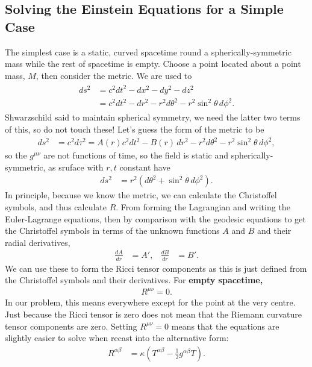 \documentclass[a4paper, 11pt, normalem]{report}
\begin{document}
\subsection{Solving the Einstein Equations for a Simple Case}
The simplest case is a static, curved spacetime round a spherically-symmetric mass while the rest of spacetime is empty. 
Choose a point located about a point mass, $M$, then consider the metric. 
We are used to 
\begin{align}
    \begin{split}
        ds^2 &= c^2dt^2 - dx^2 - dy^2 - dz^2 \\
             &= c^2dt^2 - dr^2 - r^2d\theta^2 - r^2\sin^2\theta\,d\phi^2.
    \end{split}
\end{align}
Shwarzschild said to maintain spherical symmetry, we need the latter two terms of this, so do not touch these!
Let's guess the form of the metric to be
\begin{align}
    ds^2 &= c^2d\tau^2 = A(r)c^2dt^2 - B(r)\,dr^2 - r^2d\theta^2 - r^2\sin^2\theta\,d\phi^2,
\end{align}
so the $g^{\mu\nu}$ are not functions of time, so the field is static and spherically-symmetric, as sruface with $r,t$ constant have
\begin{align}
    ds^2 &= r^2\left(d\theta^2+\sin^2\theta\,d\phi^2\right).
\end{align}
In principle, because we know the metric, we can calculate the Christoffel symbols, and thus calculate $R$.
From forming the Lagrangian and writing the Euler-Lagrange equations, then by comparison with the geodesic equations to get the Christoffel symbols in terms of the unknown functions $A$ and $B$ and their radial derivatives, 
\begin{align}
    \frac{dA}{dr} &= A', & \frac{dB}{dr} &= B'.
\end{align}
We can use these to form the Ricci tensor components as this is just defined from the Christoffel symbols and their derivatives. 
For \textbf{empty spacetime,} 
\begin{align}
    R^{\mu\nu} = 0.
\end{align}
In our problem, this means everywhere except for the point at the very centre. 
Just because the Ricci tensor is zero does not mean that the Riemann curvature tensor components are zero. 
Setting $R^{\mu\nu}=0$ means that the equations are slightly easier to solve when recast into the alternative form:
\begin{align}
    R^{\alpha\beta} &= \kappa\left(T^{\alpha\beta}-\frac12g^{\alpha\beta}T\right).
\end{align}
\end{document}
